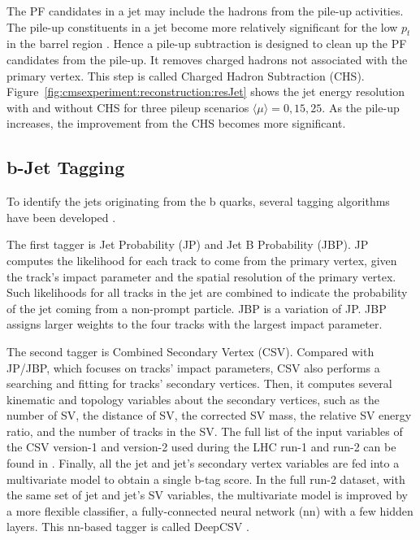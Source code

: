 The PF candidates in a jet may include the hadrons from the pile-up activities. The pile-up constituents in a jet become more relatively significant for the low $p_t$ in the barrel region \cite{cms:particleflow:Sirunyan:2017ulk}. Hence a pile-up subtraction is designed to clean up the PF candidates from the pile-up. It removes charged hadrons not associated with the primary vertex. This step is called Charged Hadron Subtraction (CHS). Figure~\ref{fig:cmsexperiment:reconstruction:resJet} shows the jet energy resolution with and without CHS for three pileup scenarios $\langle \mu\rangle =0,15,25$. As the pile-up increases, the improvement from the CHS becomes more significant.  





\subsection{b-Jet Tagging}

To identify the jets originating from the b quarks, several tagging algorithms have been developed \cite{Chatrchyan:2012jua, Sirunyan:2017ezt, Bols:2020bkb}. 

The first tagger is Jet Probability (JP) and Jet B Probability (JBP). JP computes the likelihood for each track to come from the primary vertex, given the track's impact parameter and the spatial resolution of the primary vertex. Such likelihoods for all tracks in the jet are combined to indicate the probability of the jet coming from a non-prompt particle. JBP is a variation of JP. JBP assigns larger weights to the four tracks with the largest impact parameter. 

The second tagger is Combined Secondary Vertex (CSV). Compared with JP/JBP, which focuses on tracks' impact parameters, CSV also performs a searching and fitting for tracks' secondary vertices. Then, it computes several kinematic and topology variables about the secondary vertices, such as the number of SV, the distance of SV, the corrected SV mass, the relative SV energy ratio, and the number of tracks in the SV. The full list of the input variables of the CSV version-1 and version-2 used during the LHC run-1 and run-2 can be found in \cite{Sirunyan:2017ezt}. Finally, all the jet and jet's secondary vertex variables are fed into a multivariate model to obtain a single b-tag score. In the full run-2 dataset, with the same set of jet and jet's SV variables, the multivariate model is improved by a more flexible classifier, a fully-connected neural network (nn) with a few hidden layers. This nn-based tagger is called DeepCSV \cite{Bols:2020bkb}.

